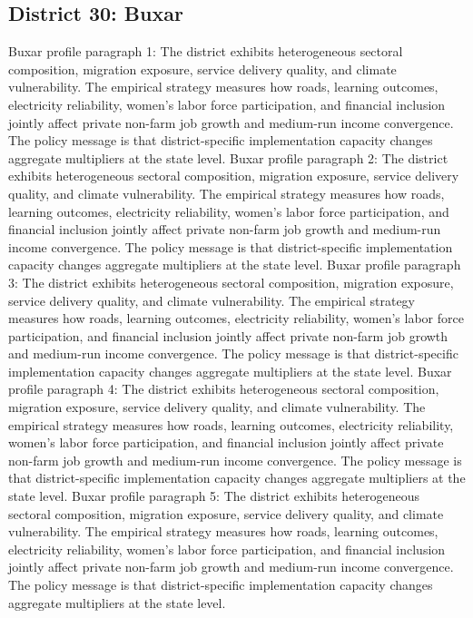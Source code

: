 \documentclass[preprint,12pt]{elsarticle}
\begin{document}
\subsection{District 30: Buxar}
Buxar profile paragraph 1: The district exhibits heterogeneous sectoral composition, migration exposure, service delivery quality, and climate vulnerability. The empirical strategy measures how roads, learning outcomes, electricity reliability, women's labor force participation, and financial inclusion jointly affect private non-farm job growth and medium-run income convergence. The policy message is that district-specific implementation capacity changes aggregate multipliers at the state level.
Buxar profile paragraph 2: The district exhibits heterogeneous sectoral composition, migration exposure, service delivery quality, and climate vulnerability. The empirical strategy measures how roads, learning outcomes, electricity reliability, women's labor force participation, and financial inclusion jointly affect private non-farm job growth and medium-run income convergence. The policy message is that district-specific implementation capacity changes aggregate multipliers at the state level.
Buxar profile paragraph 3: The district exhibits heterogeneous sectoral composition, migration exposure, service delivery quality, and climate vulnerability. The empirical strategy measures how roads, learning outcomes, electricity reliability, women's labor force participation, and financial inclusion jointly affect private non-farm job growth and medium-run income convergence. The policy message is that district-specific implementation capacity changes aggregate multipliers at the state level.
Buxar profile paragraph 4: The district exhibits heterogeneous sectoral composition, migration exposure, service delivery quality, and climate vulnerability. The empirical strategy measures how roads, learning outcomes, electricity reliability, women's labor force participation, and financial inclusion jointly affect private non-farm job growth and medium-run income convergence. The policy message is that district-specific implementation capacity changes aggregate multipliers at the state level.
Buxar profile paragraph 5: The district exhibits heterogeneous sectoral composition, migration exposure, service delivery quality, and climate vulnerability. The empirical strategy measures how roads, learning outcomes, electricity reliability, women's labor force participation, and financial inclusion jointly affect private non-farm job growth and medium-run income convergence. The policy message is that district-specific implementation capacity changes aggregate multipliers at the state level.
\end{document}
